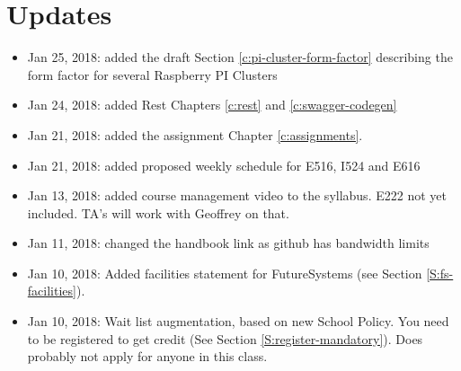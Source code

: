 
\chapter{Updates}

\begin{itemize}

\item Jan 25, 2018: added the draft Section
  \ref{c:pi-cluster-form-factor} describing the form factor for
  several Raspberry PI Clusters

\item Jan 24, 2018: added Rest Chapters \ref{c:rest} and
  \ref{c:swagger-codegen}
 
\item Jan 21, 2018: added the assignment Chapter \ref{c:assignments}.

\item Jan 21, 2018: added proposed weekly schedule for E516, I524 and
  E616

\item Jan 13, 2018: added course management video to the
  syllabus. E222 not yet included. TA's will work with Geoffrey on
  that.

\item Jan 11, 2018: changed the handbook link as github has bandwidth
  limits

\item Jan 10, 2018: Added facilities statement for FutureSystems (see
  Section \ref{S:fs-facilities}).

\item Jan 10, 2018: Wait list augmentation, based on new School
  Policy. You need to be registered to get credit (See Section
  \ref{S:register-mandatory}). Does probably not apply for anyone in
  this class.

\end{itemize}

